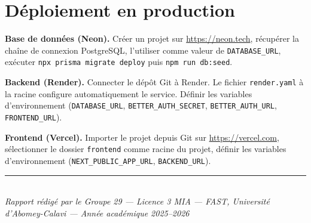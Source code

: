 \documentclass[11pt,a4paper]{report}
\begin{document}
\section*{Déploiement en production}
\textbf{Base de données (Neon).} Créer un projet sur \url{https://neon.tech},
récupérer la chaîne de connexion PostgreSQL, l'utiliser comme valeur de
\texttt{DATABASE\_URL}, exécuter \texttt{npx prisma migrate deploy} puis
\texttt{npm run db:seed}.

\noindent\textbf{Backend (Render).} Connecter le dépôt Git à Render. Le fichier
\texttt{render.yaml} à la racine configure automatiquement le service. Définir
les variables d'environnement (\texttt{DATABASE\_URL},
\texttt{BETTER\_AUTH\_SECRET}, \texttt{BETTER\_AUTH\_URL},
\texttt{FRONTEND\_URL}).

{\sloppy
\noindent\textbf{Frontend (Vercel).} Importer le projet depuis Git sur
\url{https://vercel.com}, sélectionner le dossier \texttt{frontend} comme racine
du projet, définir les variables d'environnement
(\texttt{NEXT\_PUBLIC\_APP\_URL}, \texttt{BACKEND\_URL}).
\par}

\vspace{1cm}
\begin{center}
\rule{0.6\linewidth}{0.4pt}\\[0.4em]
\textit{Rapport rédigé par le Groupe 29 — Licence 3 MIA — FAST, Université
d'Abomey-Calavi — Année académique 2025--2026}
\end{center}
\end{document}
